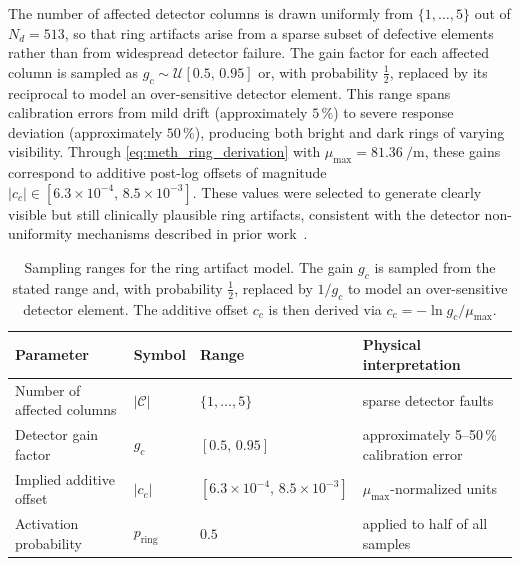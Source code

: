 The number of affected detector columns is drawn uniformly from $\{1,\dots,5\}$ out of $N_d=513$, so that ring artifacts arise from a sparse subset of defective elements rather than from widespread detector failure. The gain factor for each affected column is sampled as $g_c \sim \mathcal{U}[0.5,\,0.95]$ or, with probability $\tfrac12$, replaced by its reciprocal to model an over-sensitive detector element. This range spans calibration errors from mild drift (approximately $5\,\%$) to severe response deviation (approximately $50\,\%$), producing both bright and dark rings of varying visibility. Through \eqref{eq:meth_ring_derivation} with $\mu_{\max}=\SI{81.36}{\per\metre}$, these gains correspond to additive post-log offsets of magnitude $|c_c| \in [6.3\times10^{-4},\,8.5\times10^{-3}]$. These values were selected to generate clearly visible but still clinically plausible ring artifacts, consistent with the detector non-uniformity mechanisms described in prior work~\cite{Sijbers2004, Prell2009}.

\begin{table}[!htb]
    \centering
    \caption[Parameters of the ring artifact model.]{%
        Sampling ranges for the ring artifact model. The gain $g_c$ is sampled from the stated range and, with probability $\tfrac12$, replaced by $1/g_c$ to model an over-sensitive detector element. The additive offset $c_c$ is then derived via $c_c=-\ln g_c/\mu_{\max}$.}
    \label{tab:meth_ring_params}
    \small
    \setlength{\tabcolsep}{4pt}
    \begin{tabular}{@{}l l l p{}@{}}
        \toprule
        Parameter                    & Symbol                & Range                              & Physical interpretation \\
        \midrule
        Number of affected columns   & $|\mathcal{C}|$       & $\{1,\dots,5\}$                    & sparse detector faults \\
        Detector gain factor         & $g_c$                 & $[0.5,\,0.95]$                     & approximately 5--50\,\% calibration error \\
        Implied additive offset      & $|c_c|$               & $[6.3\times10^{-4},\,8.5\times10^{-3}]$ & $\mu_{\max}$-normalized units \\
        Activation probability       & $p_\text{ring}$       & $0.5$                              & applied to half of all samples \\
        \bottomrule
    \end{tabular}
\end{table}


